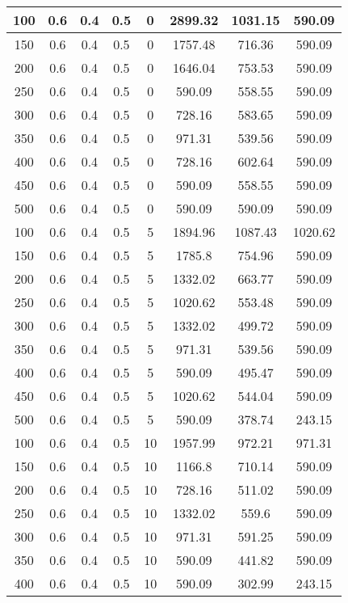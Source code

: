 \documentclass[a4paper, 12pt]{extreport}
\begin{document}
\begin{itemize}
\begin{longtable}{|c|c|c|c|c|c|c|c|}
			100 & 0.6 & 0.4 & 0.5 & 0 & 2899.32 & 1031.15 & 590.09 \\\hline
			150 & 0.6 & 0.4 & 0.5 & 0 & 1757.48 & 716.36 & 590.09 \\\hline
			200 & 0.6 & 0.4 & 0.5 & 0 & 1646.04 & 753.53 & 590.09 \\\hline
			250 & 0.6 & 0.4 & 0.5 & 0 & 590.09 & 558.55 & 590.09 \\\hline
			300 & 0.6 & 0.4 & 0.5 & 0 & 728.16 & 583.65 & 590.09 \\\hline
			350 & 0.6 & 0.4 & 0.5 & 0 & 971.31 & 539.56 & 590.09 \\\hline
			400 & 0.6 & 0.4 & 0.5 & 0 & 728.16 & 602.64 & 590.09 \\\hline
			450 & 0.6 & 0.4 & 0.5 & 0 & 590.09 & 558.55 & 590.09 \\\hline
			500 & 0.6 & 0.4 & 0.5 & 0 & 590.09 & 590.09 & 590.09 \\\hline
			100 & 0.6 & 0.4 & 0.5 & 5 & 1894.96 & 1087.43 & 1020.62 \\\hline
			150 & 0.6 & 0.4 & 0.5 & 5 & 1785.8 & 754.96 & 590.09 \\\hline
			200 & 0.6 & 0.4 & 0.5 & 5 & 1332.02 & 663.77 & 590.09 \\\hline
			250 & 0.6 & 0.4 & 0.5 & 5 & 1020.62 & 553.48 & 590.09 \\\hline
			300 & 0.6 & 0.4 & 0.5 & 5 & 1332.02 & 499.72 & 590.09 \\\hline
			350 & 0.6 & 0.4 & 0.5 & 5 & 971.31 & 539.56 & 590.09 \\\hline
			400 & 0.6 & 0.4 & 0.5 & 5 & 590.09 & 495.47 & 590.09 \\\hline
			450 & 0.6 & 0.4 & 0.5 & 5 & 1020.62 & 544.04 & 590.09 \\\hline
			500 & 0.6 & 0.4 & 0.5 & 5 & 590.09 & 378.74 & 243.15 \\\hline
			100 & 0.6 & 0.4 & 0.5 & 10 & 1957.99 & 972.21 & 971.31 \\\hline
			150 & 0.6 & 0.4 & 0.5 & 10 & 1166.8 & 710.14 & 590.09 \\\hline
			200 & 0.6 & 0.4 & 0.5 & 10 & 728.16 & 511.02 & 590.09 \\\hline
			250 & 0.6 & 0.4 & 0.5 & 10 & 1332.02 & 559.6 & 590.09 \\\hline
			300 & 0.6 & 0.4 & 0.5 & 10 & 971.31 & 591.25 & 590.09 \\\hline
			350 & 0.6 & 0.4 & 0.5 & 10 & 590.09 & 441.82 & 590.09 \\\hline
			400 & 0.6 & 0.4 & 0.5 & 10 & 590.09 & 302.99 & 243.15 \\\hline

\end{longtable}
\end{itemize}
\end{document}
